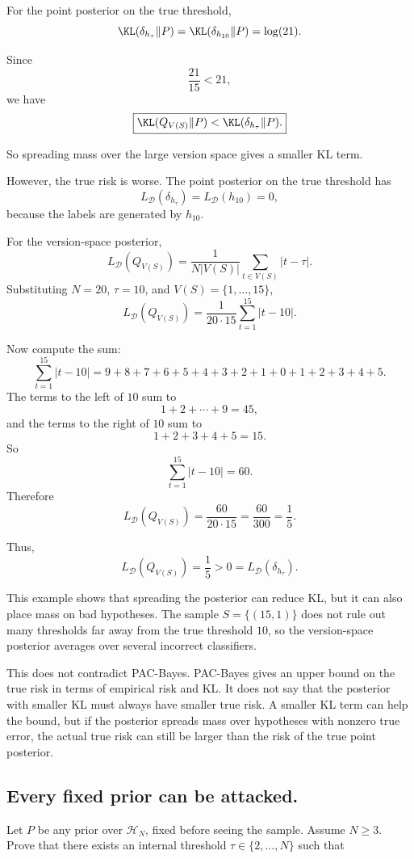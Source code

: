 \documentclass[11pt]{article}
\newcommand{\calD}{\mathcal{D}}
\begin{document}
\begin{solutionbox}
For the point posterior on the true threshold,
\[
\KL(\delta_{h_\tau}\|P)
=
\KL(\delta_{h_{10}}\|P)
=
\log(21).
\]

Since
\[
\frac{21}{15}<21,
\]
we have
\[
\boxed{
\KL(Q_{V(S)}\|P)
<
\KL(\delta_{h_\tau}\|P).
}
\]

So spreading mass over the large version space gives a smaller KL term.

However, the true risk is worse. The point posterior on the true threshold has
\[
L_{\calD}(\delta_{h_\tau})
=
L_{\calD}(h_{10})
=
0,
\]
because the labels are generated by $h_{10}$.

For the version-space posterior,
\[
L_{\calD}(Q_{V(S)})
=
\frac{1}{N|V(S)|}
\sum_{t\in V(S)}|t-\tau|.
\]
Substituting $N=20$, $\tau=10$, and $V(S)=\{1,\dots,15\}$,
\[
L_{\calD}(Q_{V(S)})
=
\frac{1}{20\cdot 15}
\sum_{t=1}^{15}|t-10|.
\]

Now compute the sum:
\[
\sum_{t=1}^{15}|t-10|
=
9+8+7+6+5+4+3+2+1+0+1+2+3+4+5.
\]
The terms to the left of $10$ sum to
\[
1+2+\cdots+9=45,
\]
and the terms to the right of $10$ sum to
\[
1+2+3+4+5=15.
\]
So
\[
\sum_{t=1}^{15}|t-10|=60.
\]
Therefore
\[
L_{\calD}(Q_{V(S)})
=
\frac{60}{20\cdot 15}
=
\frac{60}{300}
=
\frac15.
\]

Thus,
\[
\boxed{
L_{\calD}(Q_{V(S)})=\frac15
>
0
=
L_{\calD}(\delta_{h_\tau}).
}
\]

This example shows that spreading the posterior can reduce KL, but it can also place mass on bad hypotheses. The sample $S=\{(15,1)\}$ does not rule out many thresholds far away from the true threshold $10$, so the version-space posterior averages over several incorrect classifiers.

This does not contradict PAC-Bayes. PAC-Bayes gives an upper bound on the true risk in terms of empirical risk and KL. It does not say that the posterior with smaller KL must always have smaller true risk. A smaller KL term can help the bound, but if the posterior spreads mass over hypotheses with nonzero true error, the actual true risk can still be larger than the risk of the true point posterior.

\end{solutionbox}


\subsection{ Every fixed prior can be attacked.}
Let $P$ be any prior over $\mathcal{H}_N$, fixed before seeing the sample. Assume 
$N \ge 3$. Prove that there exists an internal threshold $\tau \in \{2,\dots, N\}$ such that
\end{document}

